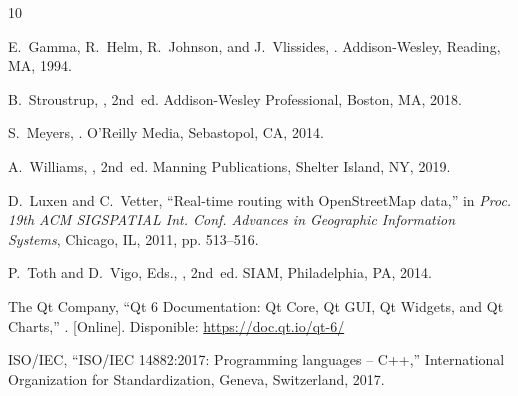 \documentclass[conference]{IEEEtran}
\begin{document}
\balance

\begin{thebibliography}{10}

E.~Gamma, R.~Helm, R.~Johnson, and J.~Vlissides,
.
\newblock Addison-Wesley, Reading, MA, 1994.

B.~Stroustrup,
, 2nd~ed.
\newblock Addison-Wesley Professional, Boston, MA, 2018.

S.~Meyers,
.
\newblock O'Reilly Media, Sebastopol, CA, 2014.

A.~Williams,
, 2nd~ed.
\newblock Manning Publications, Shelter Island, NY, 2019.

D.~Luxen and C.~Vetter,
\newblock ``Real-time routing with OpenStreetMap data,''
\newblock in {\em Proc. 19th ACM SIGSPATIAL Int. Conf. Advances in Geographic Information Systems}, Chicago, IL, 2011, pp. 513--516.

P.~Toth and D.~Vigo, Eds.,
, 2nd~ed.
\newblock SIAM, Philadelphia, PA, 2014.

The Qt Company,
\newblock ``Qt 6 Documentation: Qt Core, Qt GUI, Qt Widgets, and Qt Charts,''
. [Online]. Disponible: \url{https://doc.qt.io/qt-6/}

ISO/IEC,
\newblock ``ISO/IEC 14882:2017: Programming languages -- C++,''
\newblock International Organization for Standardization, Geneva, Switzerland, 2017.

\end{thebibliography}
\end{document}
